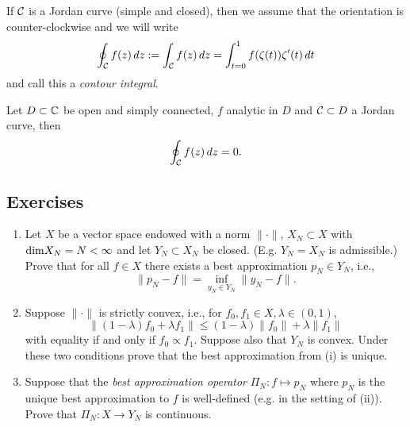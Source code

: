 If $\mathcal{C}$ is a Jordan curve (simple and closed), then we assume that the orientation is counter-clockwise and we will write
\[
    \oint_{\mathcal{C}} f(z) \,dz := \int_{\mathcal{C}} f(z) \, dz
    = \int_{t = 0}^1 f(\zeta(t)) \zeta'(t) \, dt
\]
and call this a {\em contour integral}.

\begin{proposition}
  Let $D \subset \mathbb{C}$ be open and simply connected, $f$ analytic in $D$ and
    $\mathcal{C} \subset D$ a Jordan curve, then
    \[
        \oint_{\mathcal{C}} f(z) \, dz = 0.
    \]
\end{proposition}



\subsection{Exercises}

\begin{exercise}
  \label{exr:prelims:bestapprox}
  \begin{enumerate} \ilist
  \item Let $X$ be a vector space endowed with a norm $\|\cdot\|$,
  $X_N \subset X$ with ${\rm dim} X_N = N < \infty$ and let
  $Y_N \subset X_N$ be closed. (E.g. $Y_N=X_N$ is admissible.)
  Prove that for all $f \in X$ there exists a best approximation
  $p_N \in Y_N$, i.e.,
  \[
    \| p_N - f \|  = \inf_{y_N \in Y_N} \|y_N - f\|.
  \]

  \item Suppose $\|\cdot\|$ is strictly convex, i.e., for $f_0, f_1 \in X, \lambda \in (0, 1)$,
  \[
    \| (1-\lambda) f_0 + \lambda f_1 \| \leq (1-\lambda) \|f_0\| + \lambda \|f_1 \|
  \]
  with equality if and only if $f_0 \propto f_1$. Suppose also that $Y_N$ is
  convex. Under these two conditions prove that the best approximation from (i)
  is unique.

  \item Suppose that the {\em best approximation operator}
    $\Pi_N : f \mapsto p_N$ where $p_N$ is the unique best approximation to $f$
    is well-defined (e.g. in the setting of (ii)). Prove that $\Pi_N : X \to
    Y_N$ is continuous.
  \end{enumerate}
\end{exercise}

